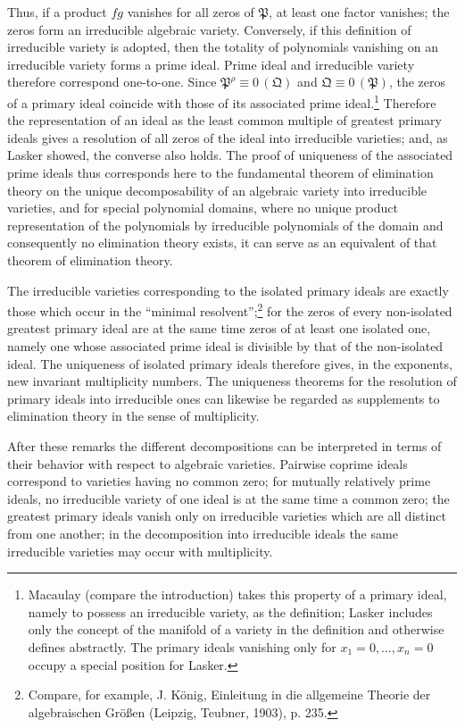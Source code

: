 \documentclass[11pt]{article}
\newcommand{\ideal}[1]{\mathfrak{#1}}
\newcommand{\eqzero}[1]{\equiv 0\,(#1)}
\begin{document}
Thus, if a product $fg$ vanishes for all zeros of $\ideal P$, at least one factor vanishes; the zeros form an irreducible algebraic variety. Conversely, if this definition of irreducible variety is adopted, then the totality of polynomials vanishing on an irreducible variety forms a prime ideal. Prime ideal and irreducible variety therefore correspond one-to-one. Since $\ideal P^\rho\eqzero{\ideal Q}$ and $\ideal Q\eqzero{\ideal P}$, the zeros of a primary ideal coincide with those of its associated prime ideal.\footnote{Macaulay (compare the introduction) takes this property of a primary ideal, namely to possess an irreducible variety, as the definition; Lasker includes only the concept of the manifold of a variety in the definition and otherwise defines abstractly. The primary ideals vanishing only for $x_1=0,
\ldots,x_n=0$ occupy a special position for Lasker.} Therefore the representation of an ideal as the least common multiple of greatest primary ideals gives a resolution of all zeros of the ideal into irreducible varieties; and, as Lasker showed, the converse also holds. The proof of uniqueness of the associated prime ideals thus corresponds here to the fundamental theorem of elimination theory on the unique decomposability of an algebraic variety into irreducible varieties, and for special polynomial domains, where no unique product representation of the polynomials by irreducible polynomials of the domain and consequently no elimination theory exists, it can serve as an equivalent of that theorem of elimination theory.

The irreducible varieties corresponding to the isolated primary ideals are exactly those which occur in the ``minimal resolvent'';\footnote{Compare, for example, J. König, Einleitung in die allgemeine Theorie der algebraischen Größen (Leipzig, Teubner, 1903), p. 235.} for the zeros of every non-isolated greatest primary ideal are at the same time zeros of at least one isolated one, namely one whose associated prime ideal is divisible by that of the non-isolated ideal. The uniqueness of isolated primary ideals therefore gives, in the exponents, new invariant multiplicity numbers. The uniqueness theorems for the resolution of primary ideals into irreducible ones can likewise be regarded as supplements to elimination theory in the sense of multiplicity.

After these remarks the different decompositions can be interpreted in terms of their behavior with respect to algebraic varieties. Pairwise coprime ideals correspond to varieties having no common zero; for mutually relatively prime ideals, no irreducible variety of one ideal is at the same time a common zero; the greatest primary ideals vanish only on irreducible varieties which are all distinct from one another; in the decomposition into irreducible ideals the same irreducible varieties may occur with multiplicity.
\end{document}
